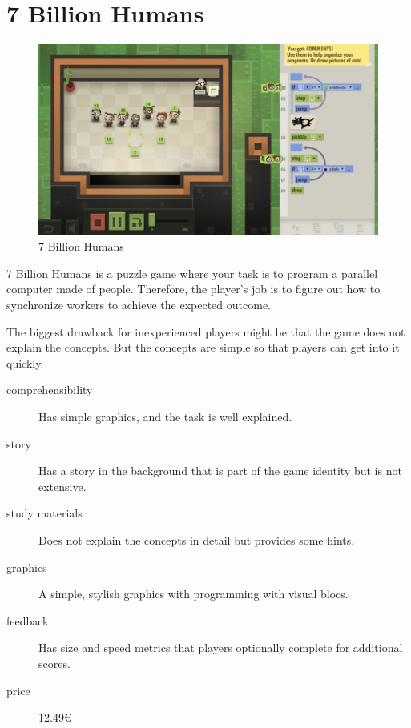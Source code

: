 \pagebreak
\section{7 Billion Humans}
\label{similar-games:7-billion-humans}

\begin{figure}
    \centering
    \includegraphics[width=1\linewidth]{assets/similar-games/7bilionhumans.jpg}
    \caption{7 Billion Humans~\cite{a2022_tomorrow}}
    \label{fig:7bilionhumans}
\end{figure}

7 Billion Humans is a puzzle game where your task is to program a parallel computer made of people.
Therefore, the player's job is to figure out how to synchronize workers to achieve the expected outcome.

The biggest drawback for inexperienced players might be that the game does not explain the concepts.
But the concepts are simple so that players can get into it quickly.

\begin{description}
    \item[comprehensibility] Has simple graphics, and the task is well explained.
    \item[story] Has a story in the background that is part of the game identity but is not extensive.
    \item[study materials] Does not explain the concepts in detail but provides some hints.
    \item[graphics] A simple, stylish graphics with programming with visual blocs.
    \item[feedback] Has size and speed metrics that players optionally complete for additional scores.
    \item[price] 12.49€
\end{description}

